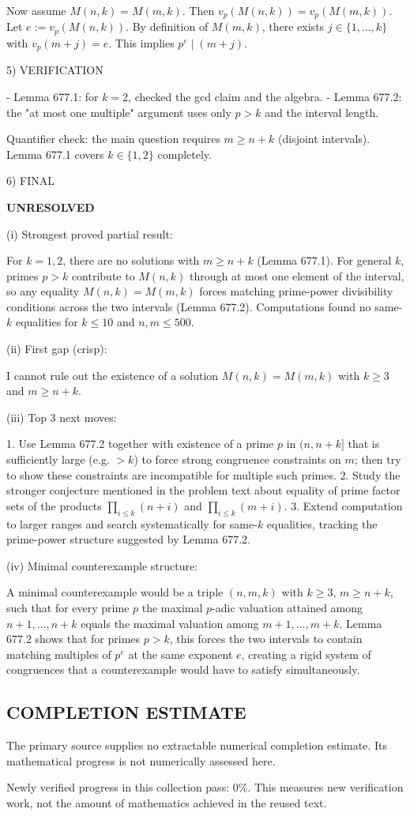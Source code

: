 Now assume $M(n,k)=M(m,k)$. Then $v_p(M(n,k))=v_p(M(m,k))$. Let $e:=v_p(M(n,k))$. By definition of $M(m,k)$, there exists $j\in\{1,\dots,k\}$ with $v_p(m+j)=e$. This implies $p^e\mid(m+j)$.


5) VERIFICATION

- Lemma 677.1: for $k=2$, checked the gcd claim and the algebra.
- Lemma 677.2: the "at most one multiple" argument uses only $p>k$ and the interval length.

Quantifier check: the main question requires $m\ge n+k$ (disjoint intervals). Lemma 677.1 covers $k\in\{1,2\}$ completely.

6) FINAL

\textbf{UNRESOLVED}

(i) Strongest proved partial result:

For $k=1,2$, there are no solutions with $m\ge n+k$ (Lemma 677.1). For general $k$, primes $p>k$ contribute to $M(n,k)$ through at most one element of the interval, so any equality $M(n,k)=M(m,k)$ forces matching prime-power divisibility conditions across the two intervals (Lemma 677.2). Computations found no same-$k$ equalities for $k\le 10$ and $n,m\le 500$.

(ii) First gap (crisp):

I cannot rule out the existence of a solution $M(n,k)=M(m,k)$ with $k\ge 3$ and $m\ge n+k$.

(iii) Top 3 next moves:

1. Use Lemma 677.2 together with existence of a prime $p$ in $(n, n+k]$ that is sufficiently large (e.g. $>k$) to force strong congruence constraints on $m$; then try to show these constraints are incompatible for multiple such primes.
2. Study the stronger conjecture mentioned in the problem text about equality of prime factor sets of the products $\prod_{i\le k}(n+i)$ and $\prod_{i\le k}(m+i)$.
3. Extend computation to larger ranges and search systematically for same-$k$ equalities, tracking the prime-power structure suggested by Lemma 677.2.

(iv) Minimal counterexample structure:

A minimal counterexample would be a triple $(n,m,k)$ with $k\ge 3$, $m\ge n+k$, such that for every prime $p$ the maximal $p$-adic valuation attained among $n+1,\dots,n+k$ equals the maximal valuation among $m+1,\dots,m+k$. Lemma 677.2 shows that for primes $p>k$, this forces the two intervals to contain matching multiples of $p^e$ at the same exponent $e$, creating a rigid system of congruences that a counterexample would have to satisfy simultaneously.



\subsection*{COMPLETION ESTIMATE}
The primary source supplies no extractable numerical completion estimate. Its mathematical progress is not numerically assessed here.

Newly verified progress in this collection pass: $0\%$. This measures new verification work, not the amount of mathematics achieved in the reused text.
